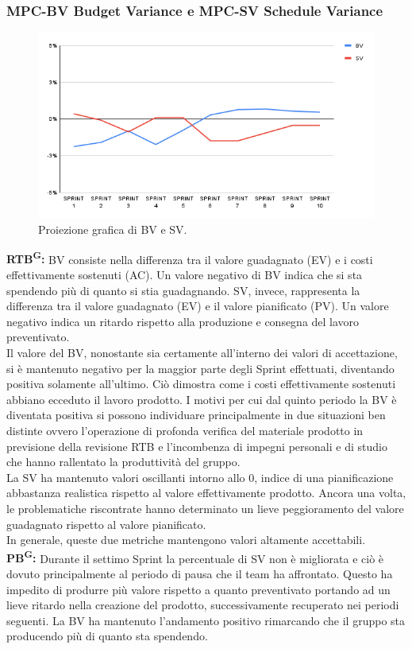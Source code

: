 \documentclass[8pt]{article}
\newcommand{\glossterm}[1]{#1\textsuperscript{G}} %
\begin{document}
\subsubsection{MPC-BV Budget Variance e MPC-SV Schedule Variance}
\begin{figure}[h!]
    \centering
    \includegraphics[width=1\textwidth]{images_pdq/BV_SV.png}
    \caption{Proiezione grafica di BV e SV.}
    \label{fig:Proiezione grafica di BV e SV}
\end{figure}
\textbf{\glossterm{RTB}:} BV consiste nella differenza tra il valore guadagnato (EV) e i costi effettivamente sostenuti (AC). Un valore negativo di BV indica che si sta spendendo più di quanto si stia guadagnando. SV, invece, rappresenta la differenza tra il valore guadagnato (EV) e il valore pianificato (PV). Un valore negativo indica un ritardo rispetto alla produzione e consegna del lavoro preventivato.\\
Il valore del BV, nonostante sia certamente all'interno dei valori di accettazione, si è mantenuto negativo per la maggior parte degli Sprint effettuati, diventando positiva solamente all'ultimo. Ciò dimostra come i costi effettivamente sostenuti abbiano ecceduto il lavoro prodotto. I motivi per cui dal quinto periodo la BV è diventata positiva si possono individuare principalmente in due situazioni ben distinte ovvero l'operazione di profonda verifica del materiale prodotto in previsione della revisione RTB e l'incombenza di impegni personali e di studio che hanno rallentato la produttività del gruppo.\\
La SV ha mantenuto valori oscillanti intorno allo 0, indice di una pianificazione abbastanza realistica rispetto al valore effettivamente prodotto. Ancora una volta, le problematiche riscontrate hanno determinato un lieve peggioramento del valore guadagnato rispetto al valore pianificato.\\
In generale, queste due metriche mantengono valori altamente accettabili.\\
\textbf{\glossterm{PB}:} Durante il settimo Sprint la percentuale di SV non è migliorata e ciò è dovuto principalmente al periodo di pausa che il team ha affrontato. Questo ha impedito di produrre più valore rispetto a quanto preventivato portando ad un lieve ritardo nella creazione del prodotto, successivamente recuperato nei periodi seguenti. La BV ha mantenuto l'andamento positivo rimarcando che il gruppo sta producendo più di quanto sta spendendo.
\clearpage
\end{document}
